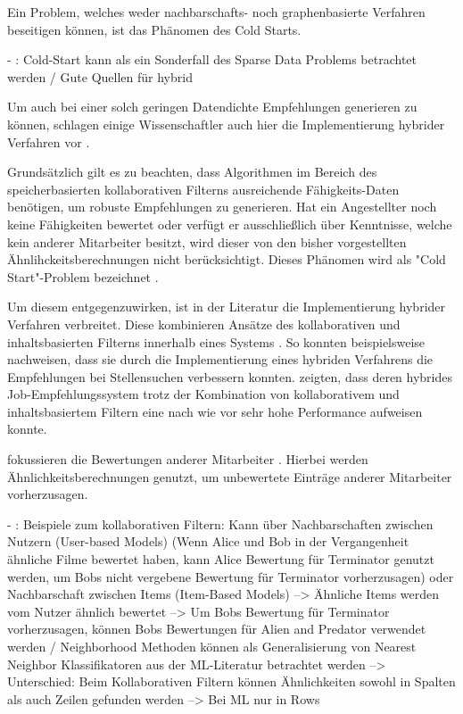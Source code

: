\newpage
Ein Problem, welches weder nachbarschafts- noch graphenbasierte Verfahren beseitigen können, ist das Phänomen des Cold Starts.

- \cite[S. 5]{huang:2004}: Cold-Start kann als ein Sonderfall des Sparse Data Problems betrachtet werden / Gute Quellen für hybrid










Um auch bei einer solch geringen Datendichte Empfehlungen generieren zu können, schlagen einige Wissenschaftler auch hier die Implementierung hybrider Verfahren vor \cite[S. 3]{weightedSimilarity:2015}.

Grundsätzlich gilt es zu beachten, dass Algorithmen im Bereich des speicherbasierten kollaborativen Filterns ausreichende Fähigkeits-Daten benötigen, um robuste Empfehlungen zu generieren. Hat ein Angestellter noch keine Fähigkeiten bewertet oder verfügt er ausschließlich über Kenntnisse, welche kein anderer Mitarbeiter besitzt, wird dieser von den bisher vorgestellten Ähnlihckeitsberechnungen nicht berücksichtigt. Dieses Phänomen wird als "Cold Start"-Problem bezeichnet \cite[S. 1]{coldStart:2002}. 

Um diesem entgegenzuwirken, ist in der Literatur die Implementierung hybrider Verfahren verbreitet. Diese kombinieren Ansätze des kollaborativen und inhaltsbasierten Filterns innerhalb eines Systems \cite[S. 8]{malinowski:2008}. So konnten beispielsweise \textcite[S. 8]{combiningCbAndCFCostSensitiveApproach:2017} nachweisen, dass sie durch die Implementierung eines hybriden Verfahrens die Empfehlungen bei Stellensuchen verbessern konnten. \textcite[S. 16]{hybridImmunizing:2017} zeigten, dass deren hybrides Job-Empfehlungssystem trotz der Kombination von kollaborativem und inhaltsbasiertem Filtern eine nach wie vor sehr hohe Performance aufweisen konnte.




\newpage

fokussieren die Bewertungen anderer Mitarbeiter \cite[S. 3]{jobMatcher:2020}. Hierbei werden Ähnlichkeitsberechnungen genutzt, um unbewertete Einträge anderer Mitarbeiter vorherzusagen. 

- \cite[S. 33]{recommenderSystems:2016}: Beispiele zum kollaborativen Filtern: Kann über Nachbarschaften zwischen Nutzern (User-based Models) (Wenn Alice und Bob in der Vergangenheit ähnliche Filme bewertet haben, kann Alice Bewertung für Terminator genutzt werden, um Bobs nicht vergebene Bewertung für Terminator vorherzusagen) oder Nachbarschaft zwischen Items (Item-Based Models) --> Ähnliche Items werden vom Nutzer ähnlich bewertet --> Um Bobs Bewertung für Terminator vorherzusagen, können Bobs Bewertungen für Alien and Predator verwendet werden / Neighborhood Methoden können als Generalisierung von Nearest Neighbor Klassifikatoren aus der ML-Literatur betrachtet werden --> Unterschied: Beim Kollaborativen Filtern können Ähnlichkeiten sowohl in Spalten als auch Zeilen gefunden werden --> Bei ML nur in Rows

